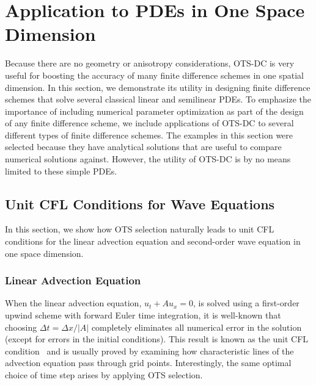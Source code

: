\documentclass[fleqn,12pt,twoside]{article}
\begin{document}
\section{\label{sec:applications_1d} 
         Application to PDEs in One Space Dimension}
Because there are no geometry or anisotropy considerations, OTS-DC is very 
useful for boosting the accuracy of many finite difference schemes in one 
spatial dimension.  In this section, we demonstrate its utility in designing 
finite difference schemes that solve several classical linear and semilinear 
PDEs.  To emphasize the importance of including numerical parameter 
optimization as part of the design of any finite difference scheme, we 
include applications of OTS-DC to several different types of finite 
difference schemes.  The examples in this section were selected because they 
have analytical solutions that are useful to compare numerical solutions 
against.  However, the utility of OTS-DC is by no means limited to these
simple PDEs.


\subsection{Unit CFL Conditions for Wave Equations}
In this section, we show how OTS selection naturally leads to unit CFL 
conditions for the linear advection equation and second-order wave equation 
in one space dimension.  

\subsubsection{Linear Advection Equation}
When the linear advection equation, $u_t + A u_x = 0$,
is solved using a first-order upwind scheme with forward Euler time
integration, it is well-known that choosing $\Delta t = \Delta x / |A|$ 
completely eliminates all numerical error in the solution (except for 
errors in the initial conditions).  This result is known as the unit CFL 
condition~\cite{leveque_book_2002} and is usually proved by examining how 
characteristic lines of the advection equation pass through grid points.  
Interestingly, the same optimal choice of time step arises by applying OTS 
selection.  
\end{document}
